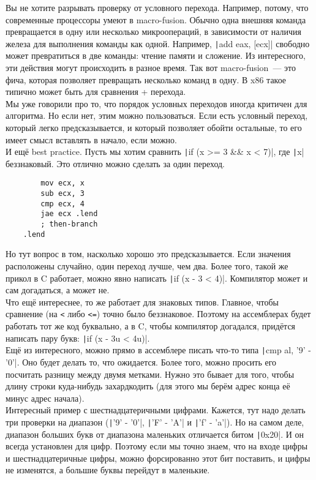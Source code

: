 \documentclass{article}
\begin{document}
    Вы не хотите разрывать проверку от условного перехода. Например, потому, что современные процессоры умеют в macro-fusion. Обычно одна внешняя команда превращается в одну или несколько микроопераций, в зависимости от наличия железа для выполнения команды как одной. Например, \texttt|add eax, [ecx]| свободно может превратиться в две команды: чтение памяти и сложение. Из интересного, эти действия могут происходить в разное время. Так вот macro-fusion~--- это фича, которая позволяет превращать несколько команд в одну. В x86 такое типично может быть для сравнения + перехода.\\
    Мы уже говорили про то, что порядок условных переходов иногда критичен для алгоритма. Но если нет, этим можно пользоваться. Если есть условный переход, который легко предсказывается, и который позволяет обойти остальные, то его имеет смысл вставлять в начало, если можно.\\
    И ещё best practice. Пусть мы хотим сравнить \texttt|if (x >= 3 && x < 7)|, где \texttt|x| беззнаковый. Это отлично можно сделать за один переход.
    \begin{verbatim}
        mov ecx, x
        sub ecx, 3
        cmp ecx, 4
        jae ecx .lend
        ; then-branch
    .lend
    \end{verbatim}
    Но тут вопрос в том, насколько хорошо это предсказывается. Если значения расположены случайно, один переход лучше, чем два. Более того, такой же прикол в C работает, можно явно написать \texttt|if (x - 3 < 4)|. Компилятор может и сам догадаться, а может не.\\
    Что ещё интереснее, то же работает для знаковых типов. Главное, чтобы сравнение (на \Verb|<| либо \Verb|<=|) точно было беззнаковое. Поэтому на ассемблерах будет работать тот же код буквально, а в C, чтобы компилятор догадался, придётся написать пару букв: \texttt|if (x - 3u < 4u)|.\\
    Ещё из интересного, можно прямо в ассемблере писать что-то типа \texttt|cmp al, '9' - '0'|. Оно будет делать то, что ожидается. Более того, можно просить его посчитать разницу между двумя метками. Нужно это бывает для того, чтобы длину строки куда-нибудь захардкодить (для этого мы берём адрес конца её минус адрес начала).\\
    Интересный пример с шестнадцатеричными цифрами. Кажется, тут надо делать три проверки на диапазон (\texttt|'9' - '0'|, \texttt|'F' - 'A'| и \texttt|'f' - 'a'|). Но на самом деле, диапазон больших букв от диапазона маленьких отличается битом \texttt|0x20|. И он всегда установлен для цифр. Поэтому если мы точно знаем, что на входе цифры и шестнадцатеричные цифры, можно форсированно этот бит поставить, и цифры не изменятся, а большие буквы перейдут в маленькие.
\end{document}
